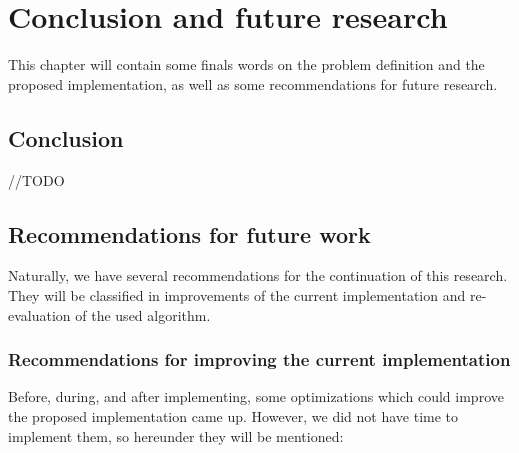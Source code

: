 
\chapter{Conclusion and future research}
\label{ch:Conclusions}

This chapter will contain some finals words on the problem definition and the proposed implementation, as well as some recommendations for future research.

\section{Conclusion}

//TODO

\section{Recommendations for future work}

Naturally, we have several recommendations for the continuation of this research. They will be classified in improvements of the current implementation and re-evaluation of the used algorithm.

\subsection{Recommendations for improving the current implementation}

Before, during, and after implementing, some optimizations which could improve the proposed implementation came up. However, we did not have time to implement them, so hereunder they will be mentioned:


